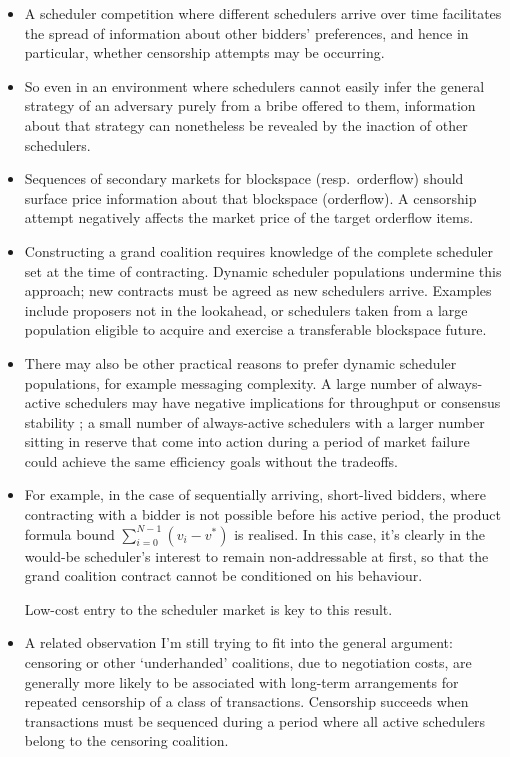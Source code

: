 \begin{itemize}
  \item
    A scheduler competition where different schedulers arrive over time facilitates the spread of information about other bidders' preferences, and hence in particular, whether censorship attempts may be occurring.

  \item
    So even in an environment where schedulers cannot easily infer the general strategy of an adversary purely from a bribe offered to them, information about that strategy can nonetheless be revealed by the inaction of other schedulers.

  \item
    Sequences of secondary markets for blockspace (resp.~orderflow) should surface price information about that blockspace (orderflow).
    A censorship attempt negatively affects the market price of the target orderflow items.

  \item
    Constructing a grand coalition requires knowledge of the complete scheduler set at the time of contracting.
    Dynamic scheduler populations undermine this approach; new contracts must be agreed as new schedulers arrive.
    Examples include proposers not in the lookahead, or schedulers taken from a large population eligible to acquire and exercise a transferable blockspace future.

  \item
    There may also be other practical reasons to prefer dynamic scheduler populations, for example messaging complexity.
    A large number of always-active schedulers may have negative implications for throughput or consensus stability \cite{wang2023security}; a small number of always-active schedulers with a larger number sitting in reserve that come into action during a period of market failure could achieve the same efficiency goals without the tradeoffs.

  \item
    For example, in the case of sequentially arriving, short-lived bidders, where contracting with a bidder is not possible before his active period, the product formula bound $\sum_{i=0}^{N-1}(v_i-v^*)$ is realised.
    In this case, it's clearly in the would-be scheduler's interest to remain non-addressable at first, so that the grand coalition contract cannot be conditioned on his behaviour.
    
    Low-cost entry to the scheduler market is key to this result.

  \item
    A related observation I'm still trying to fit into the general argument: censoring or other `underhanded' coalitions, due to negotiation costs, are generally more likely to be associated with long-term arrangements for repeated censorship of a class of transactions.
    Censorship succeeds when transactions must be sequenced during a period where all active schedulers belong to the censoring coalition.

\end{itemize}






